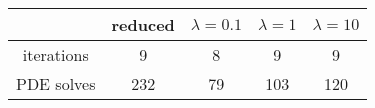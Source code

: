 \begin{tabular}{ccccc}
& reduced & $\lambda = 0.1$ & $\lambda = 1$ & $\lambda = 10$ \\
\hline
iterations & 9 & 8 & 9 & 9 \\
PDE solves & 232 & 79 & 103 & 120 \\
\hline
\end{tabular}
